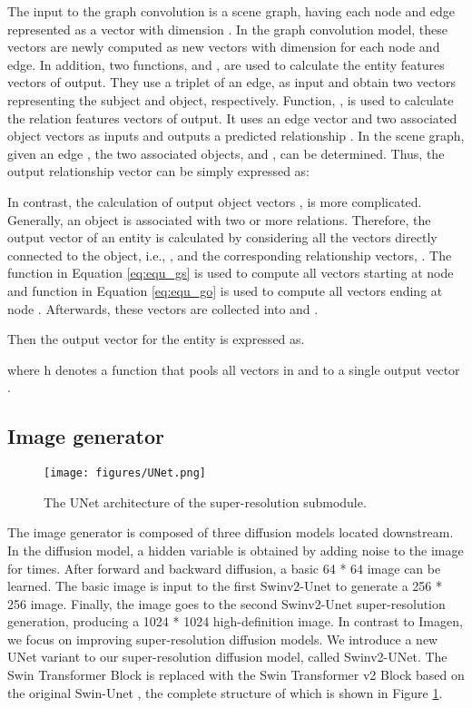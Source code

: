 \documentclass{article}
\begin{document}
The input to the graph convolution is a scene graph, having each node and edge represented as a vector with dimension . In the graph convolution model, these vectors are newly computed as new vectors with dimension   for each node and edge. In addition, two functions,  and , are used to calculate the entity features vectors of output. They use a triplet of an edge,  as input and obtain two vectors representing the subject and object, respectively. Function, , is used to calculate the relation features vectors of output. It uses an edge vector and two associated object vectors as inputs and outputs a predicted relationship . In the scene graph, given an edge , the two associated objects,  and , can be determined. Thus, the output relationship vector  can be simply expressed as:


In contrast, the calculation of output object vectors , is more complicated. Generally, an object is associated with two or more relations. Therefore, the output vector of an entity  is calculated by considering all the vectors directly connected to the object, i.e., , and the corresponding relationship vectors, . The function  in Equation \ref{eq:equ_gs} is used to compute all vectors starting at node  and function  in Equation \ref{eq:equ_go} is used to compute all vectors ending at node . Afterwards, these vectors are collected into  and .





Then the output vector  for the entity  is expressed as.


where h denotes a function that pools all vectors in  and  to a single output vector \cite{Johnson2018ImageGF}.

\subsection{Image generator }

\begin{figure}
    \centering
    \texttt{[image: figures/UNet.png]}
    \caption{The UNet architecture of the super-resolution submodule.}
    \label{fig:unet}
\end{figure}

The image generator is composed of three diffusion models located downstream. In the diffusion model, a hidden variable  is obtained by adding noise to the image for  times. After forward and backward diffusion, a basic 64 * 64 image can be learned. The basic image is input to the first Swinv2-Unet to generate a 256 * 256 image. Finally, the image goes to the second Swinv2-Unet super-resolution generation, producing a 1024 * 1024 high-definition image. In contrast to Imagen, we focus on improving super-resolution diffusion models. We introduce a new UNet variant to our super-resolution diffusion model, called Swinv2-UNet. The Swin Transformer Block is replaced with the Swin Transformer v2 Block based on the original Swin-Unet \cite{Cao2021SwinUnetUP}, the complete structure of which is shown in Figure \ref{fig:unet}.
\end{document}
